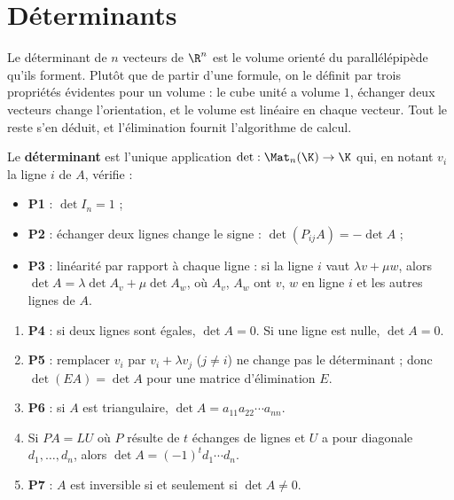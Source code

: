 \section{Déterminants}
\begin{intuition}
Le déterminant de $n$ vecteurs de $\R^n$ est le volume orienté du parallélépipède qu'ils forment. Plutôt que de partir d'une formule, on le définit par trois propriétés évidentes pour un volume : le cube unité a volume $1$, échanger deux vecteurs change l'orientation, et le volume est linéaire en chaque vecteur. Tout le reste s'en déduit, et l'élimination fournit l'algorithme de calcul.
\end{intuition}
\begin{definition}\label{def-det}
Le \textbf{déterminant} est l'unique application $\det:\Mat_n(\K)\to\K$ qui, en notant $v_i$ la ligne $i$ de $A$, vérifie :
\begin{itemize}
\item \textbf{P1} : $\det I_n=1$ ;
\item \textbf{P2} : échanger deux lignes change le signe : $\det(P_{ij}A)=-\det A$ ;
\item \textbf{P3} : linéarité par rapport à chaque ligne : si la ligne $i$ vaut $\lambda v+\mu w$, alors $\det A=\lambda\det A_v+\mu\det A_w$, où $A_v$, $A_w$ ont $v$, $w$ en ligne $i$ et les autres lignes de $A$.
\end{itemize}
\end{definition}
\begin{proposition}\label{prop-det}
\begin{enumerate}
\item \textbf{P4} : si deux lignes sont égales, $\det A=0$. Si une ligne est nulle, $\det A=0$.
\item \textbf{P5} : remplacer $v_i$ par $v_i+\lambda v_j$ ($j\neq i$) ne change pas le déterminant ; donc $\det(EA)=\det A$ pour une matrice d'élimination $E$.
\item \textbf{P6} : si $A$ est triangulaire, $\det A=a_{11}a_{22}\cdots a_{nn}$.
\item Si $PA=LU$ où $P$ résulte de $t$ échanges de lignes et $U$ a pour diagonale $d_1,\dots,d_n$, alors $\det A=(-1)^td_1\cdots d_n$.
\item \textbf{P7} : $A$ est inversible si et seulement si $\det A\neq0$.
\end{enumerate}
\end{proposition}
